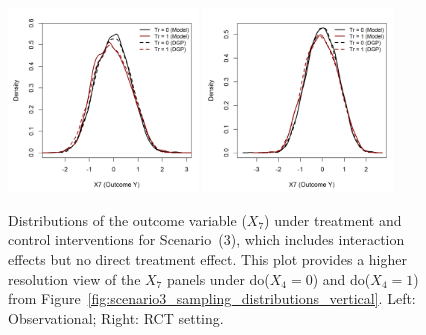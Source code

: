 \begin{figure}[htbp]
\centering
\includegraphics[width=0.45\textwidth]{img/results/observ_scenario3_X7_treatment_densities.png}
\includegraphics[width=0.45\textwidth]{img/results/rct_scenario3_X7_treatment_densities.png}
\caption{Distributions of the outcome variable ($X_7$) under treatment and control interventions for Scenario~(3), which includes interaction effects but no direct treatment effect. This plot provides a higher resolution view of the $X_7$ panels under do($X_4 = 0$) and do($X_4 = 1$) from Figure~\ref{fig:scenario3_sampling_distributions_vertical}. Left: Observational; Right: RCT setting.}
\label{fig:scenario3_outcome_distributions}
\end{figure}




